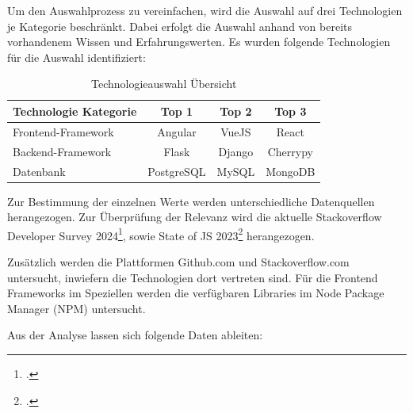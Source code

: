 Um den Auswahlprozess zu vereinfachen, wird die Auswahl auf drei Technologien je Kategorie beschränkt.
Dabei erfolgt die Auswahl anhand von bereits vorhandenem Wissen und Erfahrungswerten.
Es wurden folgende Technologien für die Auswahl identifiziert:

\begin{table}[htbp]
  \centering
  \begin{tabular}{|l|c|c|c|}
      \hline
      \textbf{Technologie Kategorie} & \textbf{Top 1} & \textbf{Top 2} & \textbf{Top 3} \\ \hline
      {Frontend-Framework} & Angular & VueJS & React \\ \hline
      {Backend-Framework} & Flask & Django & Cherrypy \\ \hline
      {Datenbank} & PostgreSQL & MySQL & MongoDB \\ \hline
  \end{tabular}
  \caption{Technologieauswahl Übersicht}\label{tab:Technologieauswahl Übersicht}
\end{table}

Zur Bestimmung der einzelnen Werte werden unterschiedliche Datenquellen herangezogen.
Zur Überprüfung der Relevanz wird die aktuelle Stackoverflow Developer Survey 2024\footcite{StackOverflow2024}, sowie State of JS 2023\footcite{stateofjsStateJavaScript2023} herangezogen.

Zusätzlich werden die Plattformen Github.com und Stackoverflow.com untersucht, inwiefern die Technologien dort vertreten sind.
Für die Frontend Frameworks im Speziellen werden die verfügbaren Libraries im Node Package Manager (NPM) untersucht.

Aus der Analyse lassen sich folgende Daten ableiten:


